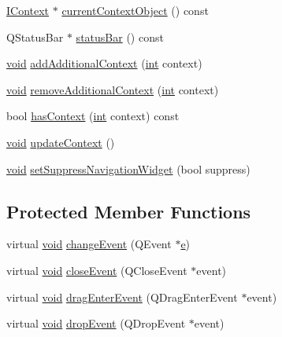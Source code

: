 \begin{DoxyCompactItemize}
\item 
\hyperlink{class_core_1_1_i_context}{I\-Context} $\ast$ \hyperlink{group___core_plugin_ga1e1438128ad3b24e3127f21ca65f3dba}{current\-Context\-Object} () const 
\item 
Q\-Status\-Bar $\ast$ \hyperlink{group___core_plugin_gad0b6f29ad56dcf30aca0db939eb985a0}{status\-Bar} () const 
\item 
\hyperlink{group___u_a_v_objects_plugin_ga444cf2ff3f0ecbe028adce838d373f5c}{void} \hyperlink{group___core_plugin_ga9175af5b201aed3337576aa33ff7e6f9}{add\-Additional\-Context} (\hyperlink{ioapi_8h_a787fa3cf048117ba7123753c1e74fcd6}{int} context)
\item 
\hyperlink{group___u_a_v_objects_plugin_ga444cf2ff3f0ecbe028adce838d373f5c}{void} \hyperlink{group___core_plugin_gae4a57783151dc82cd401ab8171eccfc6}{remove\-Additional\-Context} (\hyperlink{ioapi_8h_a787fa3cf048117ba7123753c1e74fcd6}{int} context)
\item 
bool \hyperlink{group___core_plugin_gafd618f7b7c48a635b0c81f3e9f2a1866}{has\-Context} (\hyperlink{ioapi_8h_a787fa3cf048117ba7123753c1e74fcd6}{int} context) const 
\item 
\hyperlink{group___u_a_v_objects_plugin_ga444cf2ff3f0ecbe028adce838d373f5c}{void} \hyperlink{group___core_plugin_ga63b04fba7b802e0b931cb68d4cf78968}{update\-Context} ()
\item 
\hyperlink{group___u_a_v_objects_plugin_ga444cf2ff3f0ecbe028adce838d373f5c}{void} \hyperlink{group___core_plugin_gae79dabcd76e97c71278aeb64202efd8b}{set\-Suppress\-Navigation\-Widget} (bool suppress)
\end{DoxyCompactItemize}
\subsection*{Protected Member Functions}
\begin{DoxyCompactItemize}
\item 
virtual \hyperlink{group___u_a_v_objects_plugin_ga444cf2ff3f0ecbe028adce838d373f5c}{void} \hyperlink{group___core_plugin_gaf4ca5d0d3d18ddcb7d54b6596bbf4797}{change\-Event} (Q\-Event $\ast$\hyperlink{_o_p_plots_8m_a9425be9aab51621e317ba7ade564b570}{e})
\item 
virtual \hyperlink{group___u_a_v_objects_plugin_ga444cf2ff3f0ecbe028adce838d373f5c}{void} \hyperlink{group___core_plugin_ga4e20a4a065fbb0e4d3532a45a0a91425}{close\-Event} (Q\-Close\-Event $\ast$event)
\item 
virtual \hyperlink{group___u_a_v_objects_plugin_ga444cf2ff3f0ecbe028adce838d373f5c}{void} \hyperlink{group___core_plugin_ga671bf73078069470c19965a3d948b6fa}{drag\-Enter\-Event} (Q\-Drag\-Enter\-Event $\ast$event)
\item 
virtual \hyperlink{group___u_a_v_objects_plugin_ga444cf2ff3f0ecbe028adce838d373f5c}{void} \hyperlink{group___core_plugin_gae7b97e68c51358f6f36be3c40b89c01c}{drop\-Event} (Q\-Drop\-Event $\ast$event)
\end{DoxyCompactItemize}


